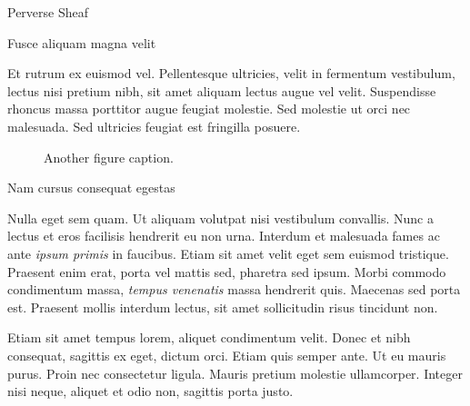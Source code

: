 \documentclass[final]{beamer}
\newlength{\colwidth}
\begin{document}
\begin{frame}[t]
\begin{columns}[t]
\begin{column}{\colwidth}
\begin{block}{Perverse Sheaf}
  \end{block}

  \begin{block}{Fusce aliquam magna velit}

    Et rutrum ex euismod vel. Pellentesque ultricies, velit in fermentum
    vestibulum, lectus nisi pretium nibh, sit amet aliquam lectus augue vel
    velit. Suspendisse rhoncus massa porttitor augue feugiat molestie. Sed
    molestie ut orci nec malesuada. Sed ultricies feugiat est fringilla
    posuere.

    \begin{figure}
      \centering
      \caption{Another figure caption.}
    \end{figure}

  \end{block}

  \begin{block}{Nam cursus consequat egestas}

    Nulla eget sem quam. Ut aliquam volutpat nisi vestibulum convallis. Nunc a
    lectus et eros facilisis hendrerit eu non urna. Interdum et malesuada fames
    ac ante \textit{ipsum primis} in faucibus. Etiam sit amet velit eget sem
    euismod tristique. Praesent enim erat, porta vel mattis sed, pharetra sed
    ipsum. Morbi commodo condimentum massa, \textit{tempus venenatis} massa
    hendrerit quis. Maecenas sed porta est. Praesent mollis interdum lectus,
    sit amet sollicitudin risus tincidunt non.

    Etiam sit amet tempus lorem, aliquet condimentum velit. Donec et nibh
    consequat, sagittis ex eget, dictum orci. Etiam quis semper ante. Ut eu
    mauris purus. Proin nec consectetur ligula. Mauris pretium molestie
    ullamcorper. Integer nisi neque, aliquet et odio non, sagittis porta justo.


\end{block}
\end{column}
\end{columns}
\end{frame}
\end{document}
